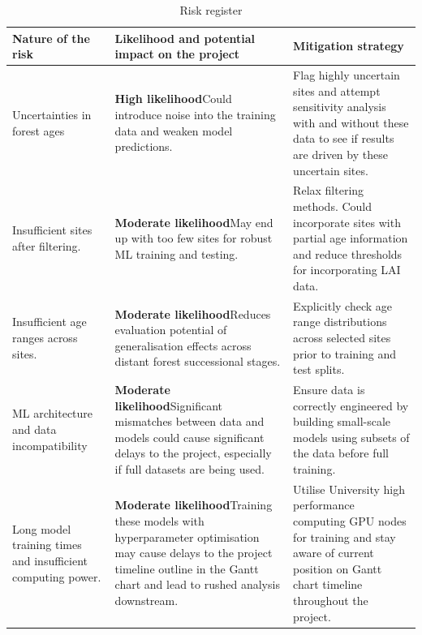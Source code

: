 \begin{table}[H]
	\centering
	\caption{Risk register}
	\label{tab:risk}
	\begin{tabularx}{\textwidth}{ X | X | X } 
		\hline\hline
		\textbf{Nature of the risk} & \textbf{Likelihood and potential impact on the project} & \textbf{Mitigation strategy} \\
		\hline
		Uncertainties in forest ages & \textbf{High likelihood}\newline Could introduce noise into the training data and weaken model predictions. & Flag highly uncertain sites and attempt sensitivity analysis with and without these data to see if results are driven by these uncertain sites. \\
		\hline
		Insufficient sites after filtering. & \textbf{Moderate likelihood}\newline May end up with too few sites for robust ML training and testing. & Relax filtering methods. Could incorporate sites with partial age information and reduce thresholds for incorporating LAI data. \\ 
		\hline
		Insufficient age ranges across sites. & \textbf{Moderate likelihood}\newline Reduces evaluation potential of generalisation effects across distant forest successional stages. & Explicitly check age range distributions across selected sites prior to training and test splits. \\
		\hline
		ML architecture and data incompatibility & \textbf{Moderate likelihood}\newline Significant mismatches between data and models could cause significant delays to the project, especially if full datasets are being used. & Ensure data is correctly engineered by building small-scale models using subsets of the data before full training.\\
		\hline
		Long model training times and insufficient computing power. & \textbf{Moderate likelihood}\newline Training these models with hyperparameter optimisation may cause delays to the project timeline outline in the Gantt chart and lead to rushed analysis downstream. & Utilise University high performance computing GPU nodes for training and stay aware of current position on Gantt chart timeline throughout the project.\\
		\hline\hline
	\end{tabularx} 
\end{table}


